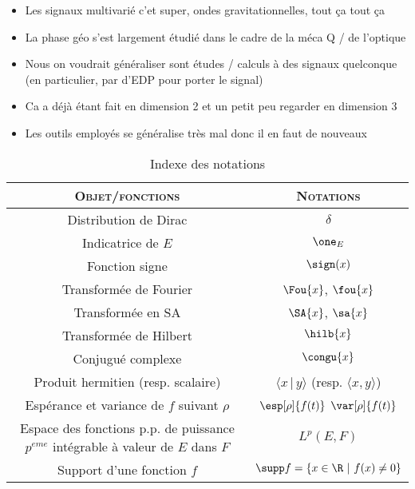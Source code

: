 \begin{itemize}
	
	\item Les signaux multivarié c'et super, ondes gravitationnelles, tout ça tout ça
	
	\item La phase géo s'est largement étudié dans le cadre de la méca Q / de l'optique
	
	\item Nous on voudrait généraliser sont études / calculs à des signaux quelconque (en particulier, par d'EDP pour porter le signal)
	
	\item Ca a déjà étant fait en dimension 2 et un petit peu regarder en dimension 3
	
	\item Les outils employés se généralise très mal donc il en faut de nouveaux
	
\end{itemize}


\begin{table}[b]\centering
	\begin{tabular}{|| c | c ||} \hline
		\textsc{Objet/fonctions}  & \textsc{Notations} \\
		\hline\hline
	 	Distribution de Dirac   &  $\delta$\\ \hline 
		Indicatrice de $E$   	 &  $\one_E$ \\ \hline 
		Fonction signe   		    &  $\sign(x)$ \\ \hline
		Transformée de Fourier   						&  $\Fou{x}$, $\fou{x}$ \\ \hline
		Transformée en SA   		  &  $\SA{x}$, $\sa{x}$ \\ \hline
		Transformée de Hilbert   	&  $\hilb{x}$ \\ \hline
		Conjugué complexe  					 &  $\congu{x}$ \\ \hline
		Produit hermitien (resp. scalaire)   &  $\langle x \,|\, y\rangle$ (resp. $\langle x,y\rangle$) \\ \hline
		Espérance et variance de $f$ suivant $\rho$   &  $\esp[\rho]{f(t)}$ $\var[\rho]{f(t)}$ \\  \hline
		Espace des fonctions p.p. de puissance $p^{eme}$ intégrable à valeur de $E$ dans $F$  &  $L^p(E, F)$ \\  \hline		
		Support d'une fonction $f$   &  $\supp f =\{x\in\R\ |\ f(x)\neq0\}$ \\  \hline
	\end{tabular}
	\caption{Indexe des notations}
	\label{tab:notation}
\end{table}




